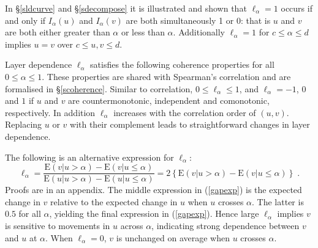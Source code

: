 \documentclass[authoryear]{elsarticle}
\newcommand{\cov}{{\rm cov}}
\newcommand{\E}{{\mathrm E}}
\newcommand{\cor}{\mathrm{cor}}
\newcommand{\cq}{\ ,\quad }
\newcommand{\eref}[1]{(\ref{#1})}
\newcommand{\sref}[1]{\S\ref{#1}}
\begin{document}
In \sref{sldcurve} and \sref{sdecompose} it is illustrated and shown  that  $\ell_\alpha=1$  occurs if and only if $I_\alpha(u)$ and $I_\alpha(v)$ are both simultaneously 1 or 0: that is $u$ and $v$ are both  either greater than $\alpha$ or less than $\alpha$.  Additionally $\ell_\alpha=1$ for $c\le\alpha\le d$ implies $u=v$ over $c\le u,v\le d$.


Layer dependence $\ell_\alpha$ satisfies the following coherence properties for all $0\le\alpha\le 1$. These properties are shared with Spearman's correlation and are formalised in \sref{scoherence}. Similar to correlation, $0\le\ell_\alpha\le 1$, and $\ell_\alpha=-1$, $0$ and $1$ if $u$ and $v$ are countermonotonic, independent and comonotonic, respectively. In addition $\ell_\alpha$ increases with the correlation order of $(u,v)$. Replacing $u$ or $v$ with their complement leads to straightforward changes in layer dependence.



The following is an alternative expression for $\ell_\alpha$:
\begin{equation}\label{gapexp}
\ell_\alpha = \frac{\E(v|u>\alpha)-\E(v|u\leq \alpha)}{\E(u|u>\alpha)-\E(u|u\leq \alpha)}
=2 \left\{\E(v|u>\alpha)-\E(v|u\leq \alpha)\right\}\;.
\end{equation}
Proofs are in an appendix. The middle expression in \eref{gapexp} is the expected change in $v$ relative to the expected change in $u$ when $u$ crosses $\alpha$. The latter is $0.5$ for all $\alpha$, yielding the final expression in \eref{gapexp}. Hence large $\ell_\alpha$ implies $v$ is sensitive to movements in $u$ across $\alpha$, indicating strong dependence between $v$ and $u$ at $\alpha$. When $\ell_\alpha=0$, $v$ is unchanged on average when $u$ crosses $\alpha$.

\end{document}
